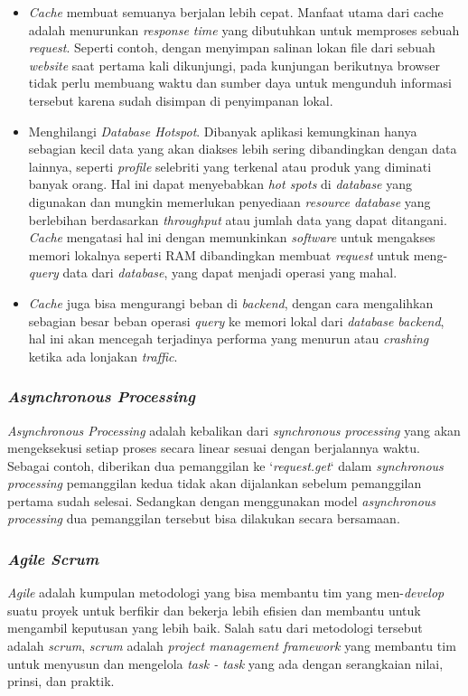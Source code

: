 \documentclass[a4paper]{article}
\newcommand{\subsubbab}[1]{%
    \subsubsection{#1}%
}
\begin{document}
\begin{itemize}
    \item \textit{Cache} membuat semuanya berjalan lebih cepat. Manfaat utama dari cache adalah menurunkan \textit{response time} yang dibutuhkan untuk memproses sebuah \textit{request}. Seperti contoh, dengan menyimpan salinan lokan file dari sebuah \textit{website} saat pertama kali dikunjungi, pada kunjungan berikutnya browser tidak perlu membuang waktu dan sumber daya untuk mengunduh informasi tersebut karena sudah disimpan di penyimpanan lokal\autocite{businessinsider_cache}.

    \item Menghilangi \textit{Database Hotspot}. Dibanyak aplikasi kemungkinan hanya sebagian kecil data yang akan diakses lebih sering dibandingkan dengan data lainnya, seperti \textit{profile} selebriti yang terkenal atau produk yang diminati banyak orang. Hal ini dapat menyebabkan \textit{hot spots} di \textit{database} yang digunakan dan mungkin memerlukan penyediaan \textit{resource database} yang berlebihan berdasarkan \textit{throughput} atau jumlah data yang dapat ditangani\autocite{AWS-caching}. \textit{Cache} mengatasi hal ini dengan memunkinkan \textit{software} untuk mengakses memori lokalnya seperti RAM dibandingkan membuat \textit{request} untuk meng-\textit{query} data dari \textit{database}, yang dapat menjadi operasi yang mahal.

    \item \textit{Cache} juga bisa mengurangi beban di \textit{backend}, dengan cara mengalihkan sebagian besar beban operasi \textit{query} ke memori lokal dari \textit{database backend}, hal ini akan mencegah terjadinya performa yang menurun atau \textit{crashing} ketika ada lonjakan \textit{traffic}.
\end{itemize}



\subsubbab{\textit{Asynchronous Processing}}
\textit{Asynchronous Processing} adalah kebalikan dari \textit{synchronous processing} yang akan mengeksekusi setiap proses secara linear sesuai dengan berjalannya waktu. Sebagai contoh, diberikan dua pemanggilan ke `\textit{request.get}` dalam \textit{synchronous processing} pemanggilan kedua tidak akan dijalankan sebelum pemanggilan pertama sudah selesai. Sedangkan dengan menggunakan model \textit{asynchronous processing} dua pemanggilan tersebut bisa dilakukan secara bersamaan\autocite{Williams_Benfield_Warner_Zadka_Mitchell_Samuel_Tardy_2019}.

\subsubbab{\textit{Agile Scrum}}
\textit{Agile} adalah kumpulan metodologi yang bisa membantu tim yang men-\textit{develop} suatu proyek untuk berfikir dan bekerja lebih efisien dan membantu untuk mengambil keputusan yang lebih baik\autocite{Stellman_Greene_2016}. Salah satu dari metodologi tersebut adalah \textit{scrum}, \textit{scrum} adalah \textit{project management framework} yang membantu tim untuk menyusun dan mengelola \textit{task - task} yang ada dengan serangkaian nilai, prinsi, dan praktik\autocite{atlassian-agile-scrum}.
\end{document}

